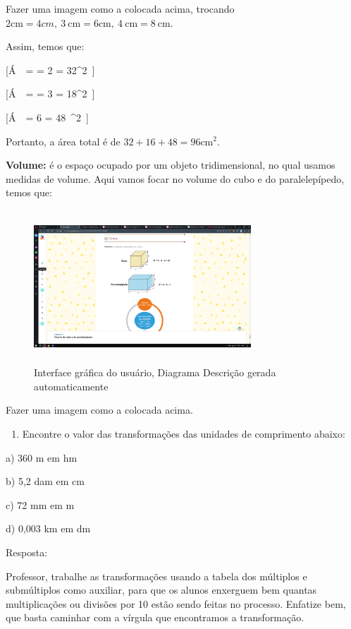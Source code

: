 Fazer uma imagem como a colocada acima, trocando
\(2\text{cm} = 4cm,\ 3\ \text{cm} = 6\text{cm},\ 4\ \text{cm} = 8\ \text{cm}\).

Assim, temos que:

[Á\ \mathrm{\Delta}\  =  = 2  = 32^2\ ]

[Á\ \mathrm{\Delta}\  =  = 3  = 18^2\ ]

[Á\ \  = 6  = 48\ ^2\ ]

Portanto, a área total é de \(32 + 16 + 48 = 96\text{cm}^2\).

\textbf{{Volume:}} é o espaço ocupado por um objeto tridimensional, no
qual usamos medidas de volume. Aqui vamos focar no volume do cubo e do
paralelepípedo, temos que:

\begin{figure}
\centering
\includegraphics[width=3.20778in,height=2.25733in]{./imgSAEB_7_MAT/media/image85.png}
\caption{Interface gráfica do usuário, Diagrama Descrição gerada
automaticamente}
\end{figure}

Fazer uma imagem como a colocada acima.


\begin{enumerate}
\def\labelenumi{\arabic{enumi})}
\tightlist
\item
  Encontre o valor das transformações das unidades de comprimento
  abaixo:
\end{enumerate}

a) 360 m em hm

b) 5,2 dam em cm

c) 72 mm em m

d) 0,003 km em dm

Resposta:

Professor, trabalhe as transformações usando a tabela dos múltiplos e
submúltiplos como auxiliar, para que os alunos enxerguem bem quantas
multiplicações ou divisões por 10 estão sendo feitas no processo.
Enfatize bem, que basta caminhar com a vírgula que encontramos a
transformação.

